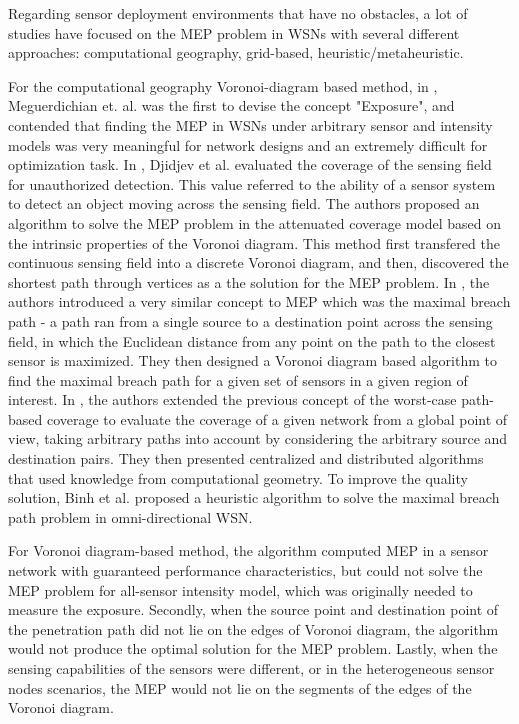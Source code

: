 \documentclass[final]{elsarticle}
\begin{document}
Regarding sensor deployment environments that have no obstacles, a lot of studies have focused on the MEP problem in WSNs with several different approaches: computational geography, grid-based, heuristic/metaheuristic.

For the computational geography Voronoi-diagram based method, in \cite{meguerdichian2001exposure}, Meguerdichian et. al. was the first to devise the concept "Exposure", and contended that finding the MEP in WSNs under arbitrary sensor and intensity models was very meaningful for network designs and an extremely difficult for optimization task. In \cite{djidjev2010approximation}, Djidjev et al. evaluated the coverage of the sensing field for unauthorized detection. This value referred to the ability of a sensor system to detect an object moving across the sensing field. The authors proposed an algorithm to solve the MEP problem in the attenuated coverage model based on the intrinsic properties of the Voronoi diagram. This method first transfered the continuous sensing field into a discrete Voronoi diagram, and then, discovered the shortest path through vertices as a the solution for the MEP problem. In \cite{megerian2005worst}, the authors introduced a very similar concept to MEP which was the maximal breach path - a path ran from a single source to a destination point across the sensing field, in which the Euclidean distance from any point on the path to the closest sensor is maximized. They then designed a Voronoi diagram based algorithm to find the maximal breach path for a given set of sensors in a given region of interest. In \cite{lee2013best}, the authors  extended the previous concept of the worst-case path-based coverage to evaluate the coverage of a given network from a global point of view, taking arbitrary paths into account by considering the arbitrary source and destination pairs. They then presented centralized and distributed algorithms that used knowledge from computational geometry. To improve the quality solution, Binh et al. \cite{binh2016heuristic} proposed a heuristic algorithm to solve the maximal breach path problem in omni-directional WSN.

For Voronoi diagram-based method, the algorithm computed MEP in a sensor network with guaranteed performance characteristics, but could not solve the MEP problem for all-sensor intensity model, which was originally needed to measure the exposure. Secondly, when the source point and destination point of the penetration
path did not lie on the edges of Voronoi diagram, the algorithm would not produce the optimal solution for the MEP problem. Lastly, when the sensing capabilities of the sensors were different, or in the heterogeneous sensor nodes scenarios, the MEP would not lie on the segments of the edges of the Voronoi diagram.
\end{document}
